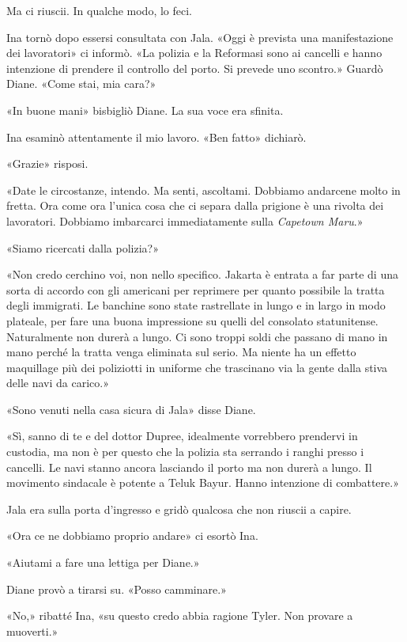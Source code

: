 Ma ci riuscii. In qualche modo, lo feci.

\separatorefiori

Ina tornò dopo essersi consultata con Jala. «Oggi è prevista una
manifestazione dei lavoratori» ci informò. «La polizia e la Reformasi
sono ai cancelli e hanno intenzione di prendere il controllo del porto.
Si prevede uno scontro.» Guardò Diane. «Come stai, mia cara?»

«In buone mani» bisbigliò Diane. La sua voce era sfinita.

Ina esaminò attentamente il mio lavoro. «Ben fatto» dichiarò.

«Grazie» risposi.

«Date le circostanze, intendo. Ma senti, ascoltami. Dobbiamo andarcene
molto in fretta. Ora come ora l'unica cosa che ci separa dalla prigione
è una rivolta dei lavoratori. Dobbiamo imbarcarci immediatamente sulla
\emph{Capetown Maru}.»

«Siamo ricercati dalla polizia?»

«Non credo cerchino voi, non nello specifico. Jakarta è entrata a far
parte di una sorta di accordo con gli americani per reprimere per quanto
possibile la tratta degli immigrati. Le banchine sono state rastrellate
in lungo e in largo in modo plateale, per fare una buona impressione su
quelli del consolato statunitense. Naturalmente non durerà a lungo. Ci
sono troppi soldi che passano di mano in mano perché la tratta venga
eliminata sul serio. Ma niente ha un effetto maquillage più dei
poliziotti in uniforme che trascinano via la gente dalla stiva delle
navi da carico.»

«Sono venuti nella casa sicura di Jala» disse Diane.

«Sì, sanno di te e del dottor Dupree, idealmente vorrebbero prendervi in
custodia, ma non è per questo che la polizia sta serrando i ranghi
presso i cancelli. Le navi stanno ancora lasciando il porto ma non
durerà a lungo. Il movimento sindacale è potente a Teluk Bayur. Hanno
intenzione di combattere.»

Jala era sulla porta d'ingresso e gridò qualcosa che non riuscii a
capire.

«Ora ce ne dobbiamo proprio andare» ci esortò Ina.

«Aiutami a fare una lettiga per Diane.»

Diane provò a tirarsi su. «Posso camminare.»

«No,» ribatté Ina, «su questo credo abbia ragione Tyler. Non provare a
muoverti.»

